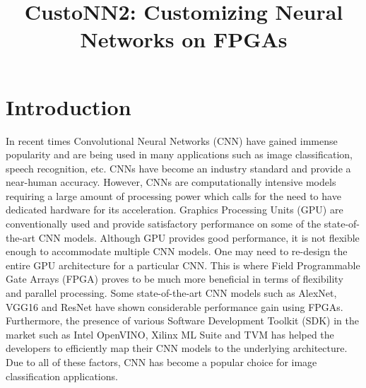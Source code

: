 \documentclass[titlepage]{report}
\title{\textbf{CustoNN2: Customizing Neural Networks on FPGAs}}
\begin{document}
\maketitle

\tableofcontents{}
\newpage

\chapter{Introduction}
In recent times Convolutional Neural Networks (CNN) have gained immense popularity and are being used in many applications such as image classification, speech recognition, etc. CNNs have become an industry standard and provide a near-human accuracy. However, CNNs are computationally intensive models requiring a large amount of processing power which calls for the need to have dedicated
hardware for its acceleration. Graphics Processing Units (GPU) are conventionally used and provide satisfactory performance on some of the state-of-the-art CNN models. Although GPU provides good performance, it is not flexible enough to accommodate multiple CNN models. One may need to re-design the entire GPU architecture for a particular CNN. This is where Field Programmable
Gate Arrays (FPGA) proves to be much more beneficial in terms of flexibility
and parallel processing. Some state-of-the-art CNN models such as AlexNet,
VGG16 and ResNet have shown considerable performance gain using FPGAs.
Furthermore, the presence of various Software Development Toolkit (SDK)
in the market such as Intel OpenVINO, Xilinx ML Suite and TVM has helped
the developers to efficiently map their CNN models to the underlying architecture. Due to all of these factors, CNN has become a popular choice for image
classification applications.
\end{document}
